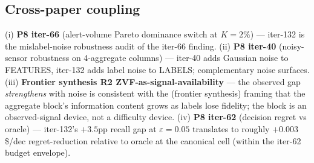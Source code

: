\subsection{Cross-paper coupling}

(i) \textbf{P8 iter-66} (alert-volume Pareto dominance switch at $K{=}2\%$)
— iter-132 is the mislabel-noise robustness audit of the iter-66 finding.
(ii) \textbf{P8 iter-40} (noisy-sensor robustness on 4-aggregate columns)
— iter-40 adds Gaussian noise to FEATURES, iter-132 adds label noise to
LABELS; complementary noise surfaces.
(iii) \textbf{Frontier synthesis R2 ZVF-as-signal-availability} — the
observed gap \emph{strengthens} with noise is consistent with the
(frontier synthesis) framing that the aggregate block's information
content grows as labels lose fidelity; the block is an observed-signal
device, not a difficulty device.
(iv) \textbf{P8 iter-62} (decision regret vs oracle) — iter-132's $+3.5$pp
recall gap at $\varepsilon{=}0.05$ translates to roughly $+0.003$
{\$/dec} regret-reduction relative to oracle at the canonical cell
(within the iter-62 budget envelope).
